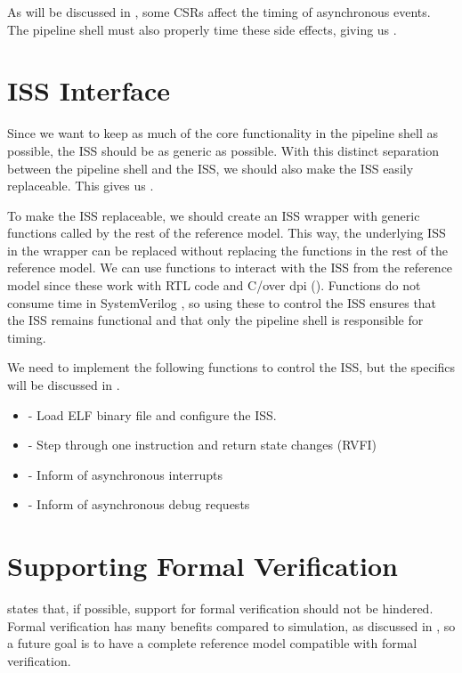 As will be discussed in , some CSRs affect the timing of asynchronous events. The pipeline shell must also properly time these side effects, giving us .


\section{ISS Interface}
\label{sec:des_iss_interface}

Since we want to keep as much of the core functionality in the pipeline shell as possible, the ISS should be as generic as possible. With this distinct separation between the pipeline shell and the ISS, we should also make the ISS easily replaceable. This gives us . 

To make the ISS replaceable, we should create an ISS wrapper with generic functions called by the rest of the reference model. This way, the underlying ISS in the wrapper can be replaced without replacing the functions in the rest of the reference model.
We can use functions to interact with the ISS from the reference model since these work with RTL code and C/\cpp over \acrfull{dpi} (). Functions do not consume time in SystemVerilog \cite{mehtaIntroductionSystemVerilog2021}, so using these to control the ISS ensures that the ISS remains functional and that only the pipeline shell is responsible for timing.

We need to implement the following functions to control the ISS, but the specifics will be discussed in .

\begin{itemize}
    \item {} - Load ELF binary file and configure the ISS.
    \item {} - Step through one instruction and return state changes (RVFI)
    \item {} - Inform of asynchronous interrupts
    \item {} - Inform of asynchronous debug requests
\end{itemize}




\section{Supporting Formal Verification}

 states that, if possible, support for formal verification should not be hindered. Formal verification has many benefits compared to simulation, as discussed in , so a future goal is to have a complete reference model compatible with formal verification.

